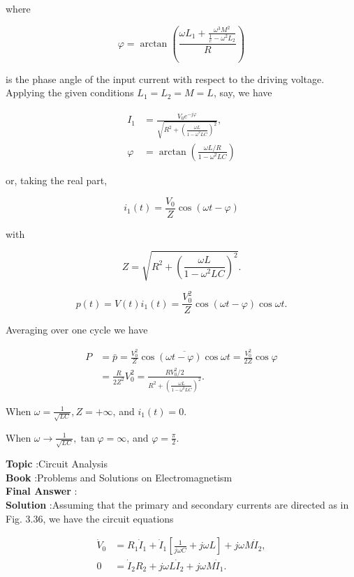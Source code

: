\documentclass[10pt]{article}
\begin{document}
where

$$
\varphi=\arctan \left(\frac{\omega L_{1}+\frac{\omega^{3} M^{2}}{\frac{1}{c}-\omega^{2} L_{2}}}{R}\right)
$$

is the phase angle of the input current with respect to the driving voltage. Applying the given conditions $L_{1}=L_{2}=M=L$, say, we have

$$
\begin{aligned}
I_{1} &=\frac{V_{0} e^{-j \varphi}}{\sqrt{R^{2}+\left(\frac{\omega L}{1-\omega^{2} L C}\right)^{2}}}, \\
\varphi &=\arctan \left(\frac{\omega L / R}{1-\omega^{2} L C}\right)
\end{aligned}
$$

or, taking the real part,

$$
i_{1}(t)=\frac{V_{0}}{Z} \cos (\omega t-\varphi)
$$

with

$$
Z=\sqrt{R^{2}+\left(\frac{\omega L}{1-\omega^{2} L C}\right)^{2}} .
$$



$$
p(t)=V(t) i_{1}(t)=\frac{V_{0}^{2}}{Z} \cos (\omega t-\varphi) \cos \omega t .
$$

Averaging over one cycle we have

$$
\begin{aligned}
P &=\bar{p}=\frac{V_{0}^{2}}{Z} \overline{\cos (\omega t-\varphi) \cos \omega t}=\frac{V_{0}^{2}}{2 Z} \cos \varphi \\
&=\frac{R}{2 Z^{2}} V_{0}^{2}=\frac{R V_{0}^{2} / 2}{R^{2}+\left(\frac{\omega L}{1-\omega^{2} L C}\right)^{2}} .
\end{aligned}
$$

 When $\omega=\frac{1}{\sqrt{L C}}, Z=+\infty$, and $i_{1}(t)=0$.

 When $\omega \rightarrow \frac{1}{\sqrt{L C}}, \tan \varphi=\infty$, and $\varphi=\frac{\pi}{2}$.

\textbf{Topic} :Circuit Analysis\\
\textbf{Book} :Problems and Solutions on Electromagnetism\\
\textbf{Final Answer} :\\


\textbf{Solution} :Assuming that the primary and secondary currents are directed as in Fig. 3.36, we have the circuit equations

$$
\begin{aligned}
\dot{V}_{0} &=R_{1} \dot{I}_{1}+\dot{I}_{1}\left[\frac{1}{j \omega C}+j \omega L\right]+j \omega M \dot{I}_{2}, \\
0 &=\dot{I}_{2} R_{2}+j \omega L \dot{I}_{2}+j \omega M \dot{I}_{1} .
\end{aligned}
$$
\end{document}
